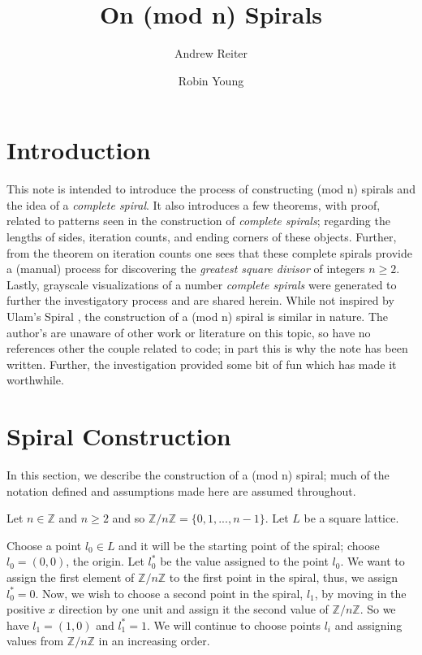 \documentclass[11pt]{amsart}
\title{On (mod n) Spirals}
\author{Andrew Reiter}
\author{Robin Young}
\theoremstyle{mydef}
\begin{document}
\maketitle
\section{Introduction}
This note is intended to introduce the process of constructing (mod n) spirals and the idea of a \textit{complete spiral}.  It also introduces a few theorems, with proof, related to patterns seen in the construction of \textit{complete spirals}; regarding the lengths of sides, iteration counts, and ending corners of these objects. Further, from the theorem on iteration counts one sees that these complete spirals provide a (manual) process for discovering the \textit{greatest square divisor} of integers $n \ge 2$. Lastly, grayscale visualizations of a number \textit{complete spirals} were generated to further the investigatory process and are shared herein. While not inspired by Ulam's Spiral \cite{Ulam}, the construction of  a (mod n) spiral is similar in nature. The author's are unaware of other work or literature on this topic, so have no references other the couple related to code; in part this is why the note has been written. Further, the investigation provided some bit of fun which has made it worthwhile.

\section{Spiral Construction}
In this section, we describe the construction of a (mod n) spiral; much of the notation defined and assumptions made here are assumed throughout.

Let $n \in \mathbb{Z}$ and $n \ge 2$ and so $\mathbb{Z}/n\mathbb{Z} = \{ 0, 1, ..., n-1 \}$. Let $L$ be a square lattice. 

Choose a point $l_0 \in L$ and it will be the starting point of the spiral; choose $l_0 = (0, 0)$, the origin. Let $l^*_0$ be the value assigned to the point $l_0$. We want to assign the first element of $\mathbb{Z}/n\mathbb{Z}$ to the first point in the spiral, thus, we assign $l^*_0 = 0$. Now, we wish to choose a second point in the spiral, $l_1$, by moving in the positive $x$ direction by one unit and assign it the second value of $\mathbb{Z}/n\mathbb{Z}$. So we have $l_1 = (1, 0)$ and $l^*_1 = 1$.  We will continue to choose points $l_i$ and assigning values from $\mathbb{Z}/n\mathbb{Z}$ in an increasing order.
\end{document}
